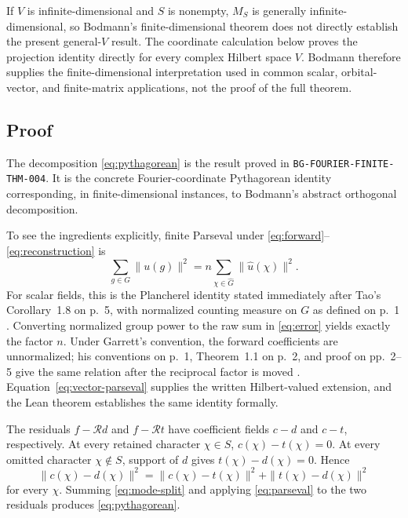 \documentclass[11pt]{article}
\begin{document}
If $V$ is infinite-dimensional and $S$ is nonempty, $M_S$ is generally infinite-dimensional, so
Bodmann's finite-dimensional theorem does not directly establish the present general-$V$ result.
The coordinate calculation below proves the projection identity directly for every complex
Hilbert space $V$.  Bodmann therefore supplies the finite-dimensional interpretation used in
common scalar, orbital-vector, and finite-matrix applications, not the proof of the full theorem.

\subsection{Proof}
The decomposition \eqref{eq:pythagorean} is the result proved in
\texttt{BG-FOURIER-FINITE-THM-004}.  It is the concrete Fourier-coordinate Pythagorean identity
corresponding, in finite-dimensional instances, to Bodmann's abstract orthogonal decomposition.

To see the ingredients explicitly, finite Parseval under
\eqref{eq:forward}--\eqref{eq:reconstruction} is
\begin{equation}
  \sum_{g\in G}\|u(g)\|^2
  =n\sum_{\chi\in\widehat G}\|\widehat u(\chi)\|^2.
  \label{eq:parseval}
\end{equation}
For scalar fields, this is the Plancherel identity stated immediately after Tao's
Corollary~1.8 on p.~5, with normalized counting measure on $G$ as defined on p.~1
\cite{Tao2007FiniteAbelian}.  Converting normalized group power to the raw sum in
\eqref{eq:error} yields exactly the factor $n$.  Under Garrett's convention, the forward
coefficients are unnormalized; his conventions on p.~1, Theorem~1.1 on p.~2, and proof on
pp.~2--5 give the same relation after the reciprocal factor is moved
\cite{Garrett2019FiniteAbelian}.  Equation~\eqref{eq:vector-parseval} supplies the written
Hilbert-valued extension, and the Lean theorem establishes the same identity formally.

The residuals $f-\mathcal R d$ and $f-\mathcal R t$ have coefficient fields $c-d$ and $c-t$,
respectively.  At every retained character $\chi\in S$, $c(\chi)-t(\chi)=0$.  At every omitted
character $\chi\notin S$, support of $d$ gives $t(\chi)-d(\chi)=0$.  Hence
\begin{equation}
  \|c(\chi)-d(\chi)\|^2
  =\|c(\chi)-t(\chi)\|^2
   +\|t(\chi)-d(\chi)\|^2
  \label{eq:mode-split}
\end{equation}
for every $\chi$.  Summing \eqref{eq:mode-split} and applying
\eqref{eq:parseval} to the two residuals produces \eqref{eq:pythagorean}.
\end{document}
